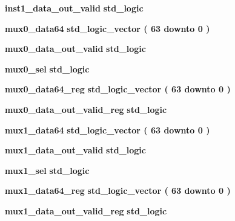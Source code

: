 \begin{DoxyCompactItemize}
\item 
{\bf inst1\+\_\+data\+\_\+out\+\_\+valid} {\bfseries \textcolor{comment}{std\+\_\+logic}\textcolor{vhdlchar}{ }} 
\item 
{\bf mux0\+\_\+data64} {\bfseries \textcolor{comment}{std\+\_\+logic\+\_\+vector}\textcolor{vhdlchar}{ }\textcolor{vhdlchar}{(}\textcolor{vhdlchar}{ }\textcolor{vhdlchar}{ } \textcolor{vhdldigit}{63} \textcolor{vhdlchar}{ }\textcolor{keywordflow}{downto}\textcolor{vhdlchar}{ }\textcolor{vhdlchar}{ } \textcolor{vhdldigit}{0} \textcolor{vhdlchar}{ }\textcolor{vhdlchar}{)}\textcolor{vhdlchar}{ }} 
\item 
{\bf mux0\+\_\+data\+\_\+out\+\_\+valid} {\bfseries \textcolor{comment}{std\+\_\+logic}\textcolor{vhdlchar}{ }} 
\item 
{\bf mux0\+\_\+sel} {\bfseries \textcolor{comment}{std\+\_\+logic}\textcolor{vhdlchar}{ }} 
\item 
{\bf mux0\+\_\+data64\+\_\+reg} {\bfseries \textcolor{comment}{std\+\_\+logic\+\_\+vector}\textcolor{vhdlchar}{ }\textcolor{vhdlchar}{(}\textcolor{vhdlchar}{ }\textcolor{vhdlchar}{ } \textcolor{vhdldigit}{63} \textcolor{vhdlchar}{ }\textcolor{keywordflow}{downto}\textcolor{vhdlchar}{ }\textcolor{vhdlchar}{ } \textcolor{vhdldigit}{0} \textcolor{vhdlchar}{ }\textcolor{vhdlchar}{)}\textcolor{vhdlchar}{ }} 
\item 
{\bf mux0\+\_\+data\+\_\+out\+\_\+valid\+\_\+reg} {\bfseries \textcolor{comment}{std\+\_\+logic}\textcolor{vhdlchar}{ }} 
\item 
{\bf mux1\+\_\+data64} {\bfseries \textcolor{comment}{std\+\_\+logic\+\_\+vector}\textcolor{vhdlchar}{ }\textcolor{vhdlchar}{(}\textcolor{vhdlchar}{ }\textcolor{vhdlchar}{ } \textcolor{vhdldigit}{63} \textcolor{vhdlchar}{ }\textcolor{keywordflow}{downto}\textcolor{vhdlchar}{ }\textcolor{vhdlchar}{ } \textcolor{vhdldigit}{0} \textcolor{vhdlchar}{ }\textcolor{vhdlchar}{)}\textcolor{vhdlchar}{ }} 
\item 
{\bf mux1\+\_\+data\+\_\+out\+\_\+valid} {\bfseries \textcolor{comment}{std\+\_\+logic}\textcolor{vhdlchar}{ }} 
\item 
{\bf mux1\+\_\+sel} {\bfseries \textcolor{comment}{std\+\_\+logic}\textcolor{vhdlchar}{ }} 
\item 
{\bf mux1\+\_\+data64\+\_\+reg} {\bfseries \textcolor{comment}{std\+\_\+logic\+\_\+vector}\textcolor{vhdlchar}{ }\textcolor{vhdlchar}{(}\textcolor{vhdlchar}{ }\textcolor{vhdlchar}{ } \textcolor{vhdldigit}{63} \textcolor{vhdlchar}{ }\textcolor{keywordflow}{downto}\textcolor{vhdlchar}{ }\textcolor{vhdlchar}{ } \textcolor{vhdldigit}{0} \textcolor{vhdlchar}{ }\textcolor{vhdlchar}{)}\textcolor{vhdlchar}{ }} 
\item 
{\bf mux1\+\_\+data\+\_\+out\+\_\+valid\+\_\+reg} {\bfseries \textcolor{comment}{std\+\_\+logic}\textcolor{vhdlchar}{ }} 
\end{DoxyCompactItemize}
